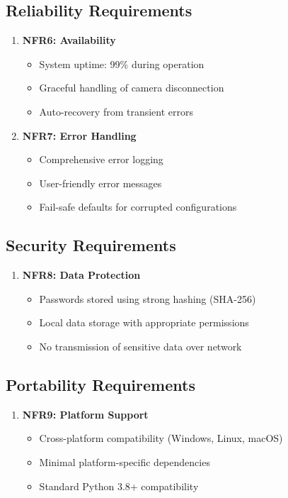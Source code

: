 \documentclass[12pt,a4paper]{report}
\begin{document}
\subsection{Reliability Requirements}

\begin{enumerate}
    \item \textbf{NFR6: Availability}
    \begin{itemize}
        \item System uptime: 99\% during operation
        \item Graceful handling of camera disconnection
        \item Auto-recovery from transient errors
    \end{itemize}
    
    \item \textbf{NFR7: Error Handling}
    \begin{itemize}
        \item Comprehensive error logging
        \item User-friendly error messages
        \item Fail-safe defaults for corrupted configurations
    \end{itemize}
\end{enumerate}

\subsection{Security Requirements}

\begin{enumerate}
    \item \textbf{NFR8: Data Protection}
    \begin{itemize}
        \item Passwords stored using strong hashing (SHA-256)
        \item Local data storage with appropriate permissions
        \item No transmission of sensitive data over network
    \end{itemize}
\end{enumerate}

\subsection{Portability Requirements}

\begin{enumerate}
    \item \textbf{NFR9: Platform Support}
    \begin{itemize}
        \item Cross-platform compatibility (Windows, Linux, macOS)
        \item Minimal platform-specific dependencies
        \item Standard Python 3.8+ compatibility
    \end{itemize}
\end{enumerate}
\end{document}
